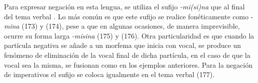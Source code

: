 Para expresar negación en esta lengua, se utiliza el sufijo {\setmainfont{Charis SIL} \textit{-mi(si)na}} que al final del tema verbal \textcolor{MidnightBlue}{\citep{sabane}}. Lo más común es que este sufijo se realice fonéticamente como -{\setmainfont{Charis SIL} \textit{mina}} (173) y (174), pese a que en algunas ocasiones, de manera imprevisible, ocurre su forma larga {\setmainfont{Charis SIL} \textit{-misina}} (175) y (176). Otra particularidad es que cuando la partícula negativa se añade a un morfema que inicia con vocal, se produce un fenómeno de eliminación de la vocal final de dicha partícula, en el caso de que la vocal sea la misma, se fusionan como en los ejemplos anteriores. Para la negación de imperativos el sufijo se coloca igualmente en el tema verbal (177).